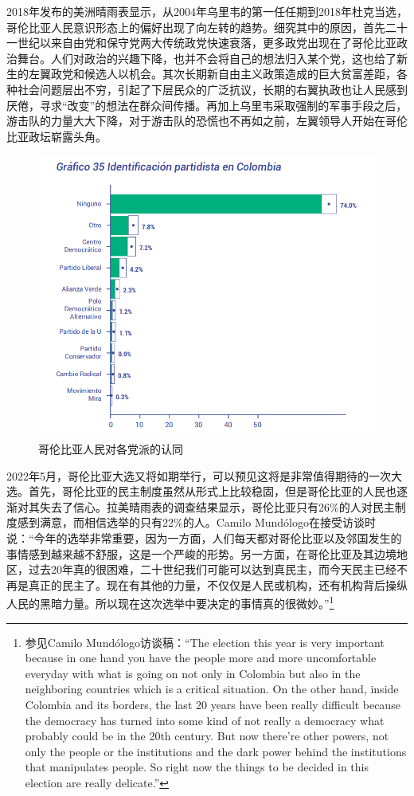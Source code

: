 \documentclass{phyasgn}\usepackage{nag}
\begin{document}
    \par 2018年发布的美洲晴雨表显示，从2004年乌里韦的第一任任期到2018年杜克当选，哥伦比亚人民意识形态上的偏好出现了向左转的趋势。细究其中的原因，首先二十一世纪以来自由党和保守党两大传统政党快速衰落，更多政党出现在了哥伦比亚政治舞台。人们对政治的兴趣下降，也并不会将自己的想法归入某个党，这也给了新生的左翼政党和候选人以机会。其次长期新自由主义政策造成的巨大贫富差距，各种社会问题层出不穷，引起了下层民众的广泛抗议，长期的右翼执政也让人民感到厌倦，寻求“改变”的想法在群众间传播。再加上乌里韦采取强制的军事手段之后，游击队的力量大大下降，对于游击队的恐慌也不再如之前，左翼领导人开始在哥伦比亚政坛崭露头角。
    \begin{figure}[!h]
                    	\centering
                    	\includegraphics[width=.9\linewidth]{pic/5.png}
                    	\caption{哥伦比亚人民对各党派的认同}
                    	\label{fig:5}
                    	\end{figure}
\par 2022年5月，哥伦比亚大选又将如期举行，可以预见这将是非常值得期待的一次大选。首先，哥伦比亚的民主制度虽然从形式上比较稳固，但是哥伦比亚的人民也逐渐对其失去了信心。拉美晴雨表的调查结果显示，哥伦比亚只有26\%的人对民主制度感到满意，而相信选举的只有22\%的人。Camilo Mundólogo在接受访谈时说：“今年的选举非常重要，因为一方面，人们每天都对哥伦比亚以及邻国发生的事情感到越来越不舒服，这是一个严峻的形势。另一方面，在哥伦比亚及其边境地区，过去20年真的很困难，二十世纪我们可能可以达到真民主，而今天民主已经不再是真正的民主了。现在有其他的力量，不仅仅是人民或机构，还有机构背后操纵人民的黑暗力量。所以现在这次选举中要决定的事情真的很微妙。”\footnote[12]{参见Camilo Mundólogo访谈稿：“The election this year is very important because in one hand you have the people more and more uncomfortable everyday with what is going on not only in Colombia but also in the neighboring countries which is a critical situation. On the other hand, inside Colombia and its borders, the last 20 years have been really difficult because the democracy has turned into some kind of not really a democracy what probably could be in the 20th century. But now there’re other powers, not only the people or the institutions and the dark power behind the institutions that manipulates people. So right now the things to be decided in this election are really delicate.”}
\end{document}
